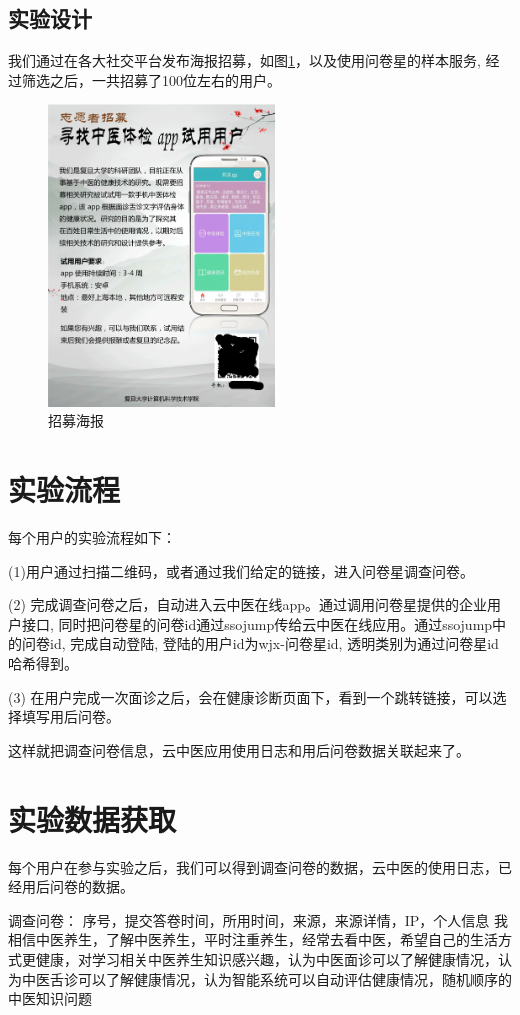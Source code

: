 \subsection{实验设计}
我们通过在各大社交平台发布海报招募，如图\ref{fig:poster}，以及使用问卷星的样本服务, 经过筛选之后，一共招募了100位左右的用户。
\begin{figure}[ht]
    \centering
    \includegraphics[height=8cm]{images/poster.png}
    \caption{招募海报}
    \label{fig:poster}
\end{figure}
\section{实验流程}

每个用户的实验流程如下：

(1)用户通过扫描二维码，或者通过我们给定的链接，进入问卷星调查问卷。

(2) 完成调查问卷之后，自动进入云中医在线app。通过调用问卷星提供的企业用户接口, 同时把问卷星的问卷id通过ssojump传给云中医在线应用。通过ssojump中的问卷id, 完成自动登陆, 登陆的用户id为wjx-{问卷星id}, 透明类别为通过问卷星id哈希得到。

(3) 在用户完成一次面诊之后，会在健康诊断页面下，看到一个跳转链接，可以选择填写用后问卷。

这样就把调查问卷信息，云中医应用使用日志和用后问卷数据关联起来了。


\section{实验数据获取}
每个用户在参与实验之后，我们可以得到调查问卷的数据，云中医的使用日志，已经用后问卷的数据。

调查问卷： 序号，提交答卷时间，所用时间，来源，来源详情，IP，个人信息	我相信中医养生，了解中医养生，平时注重养生，经常去看中医，希望自己的生活方式更健康，对学习相关中医养生知识感兴趣，认为中医面诊可以了解健康情况，认为中医舌诊可以了解健康情况，认为智能系统可以自动评估健康情况，随机顺序的中医知识问题

